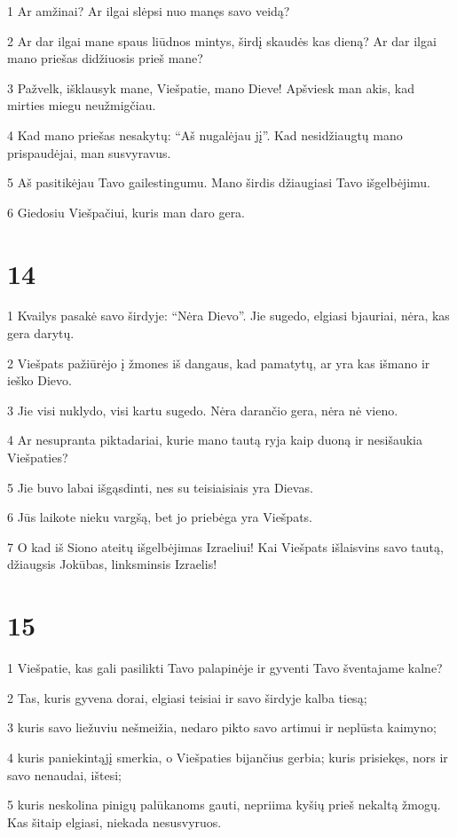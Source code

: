 \par 1 Ar amžinai? Ar ilgai slėpsi nuo manęs savo veidą? 
\par 2 Ar dar ilgai mane spaus liūdnos mintys, širdį skaudės kas dieną? Ar dar ilgai mano priešas didžiuosis prieš mane? 
\par 3 Pažvelk, išklausyk mane, Viešpatie, mano Dieve! Apšviesk man akis, kad mirties miegu neužmigčiau. 
\par 4 Kad mano priešas nesakytų: “Aš nugalėjau jį”. Kad nesidžiaugtų mano prispaudėjai, man susvyravus. 
\par 5 Aš pasitikėjau Tavo gailestingumu. Mano širdis džiaugiasi Tavo išgelbėjimu. 
\par 6 Giedosiu Viešpačiui, kuris man daro gera.



\chapter{14}


\par 1 Kvailys pasakė savo širdyje: “Nėra Dievo”. Jie sugedo, elgiasi bjauriai, nėra, kas gera darytų. 
\par 2 Viešpats pažiūrėjo į žmones iš dangaus, kad pamatytų, ar yra kas išmano ir ieško Dievo. 
\par 3 Jie visi nuklydo, visi kartu sugedo. Nėra darančio gera, nėra nė vieno. 
\par 4 Ar nesupranta piktadariai, kurie mano tautą ryja kaip duoną ir nesišaukia Viešpaties? 
\par 5 Jie buvo labai išgąsdinti, nes su teisiaisiais yra Dievas. 
\par 6 Jūs laikote nieku vargšą, bet jo priebėga yra Viešpats. 
\par 7 O kad iš Siono ateitų išgelbėjimas Izraeliui! Kai Viešpats išlaisvins savo tautą, džiaugsis Jokūbas, linksminsis Izraelis!



\chapter{15}


\par 1 Viešpatie, kas gali pasilikti Tavo palapinėje ir gyventi Tavo šventajame kalne? 
\par 2 Tas, kuris gyvena dorai, elgiasi teisiai ir savo širdyje kalba tiesą; 
\par 3 kuris savo liežuviu nešmeižia, nedaro pikto savo artimui ir neplūsta kaimyno; 
\par 4 kuris paniekintąjį smerkia, o Viešpaties bijančius gerbia; kuris prisiekęs, nors ir savo nenaudai, ištesi; 
\par 5 kuris neskolina pinigų palūkanoms gauti, nepriima kyšių prieš nekaltą žmogų. Kas šitaip elgiasi, niekada nesusvyruos.



